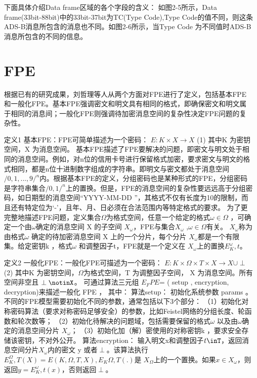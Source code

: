 下面具体介绍Data frame区域的各个字段的含义：
如图2-5所示，Data frame(33bit-88bit)中的33bit-37bit为TC(Type Code),Type Code的值不同，则这条ADS-B消息所包含的消息也不同。如图2-6所示，当Type Code 为不同值时ADS-B消息所包含的不同的信息。


\section{FPE}
根据已有的研究成果，刘哲理等人\cite{liu2012ge}从两个方面对FPE进行了定义，包括基本FPE和一般化FPE。基本FPE强调密文和明文具有相同的格式，即确保密文和明文属于相同的消息间；一般化FPE则强调待加密消息空间的复杂性决定FPE问题的复杂性。

定义1 基本FPE：FPE可简单描述为一个密码： 
$E \colon K \times X \to X$                   (1)
其中K 为密钥空间，X 为消息空间\cite{bellare2010ffx}。 
基本FPE描述了FPE要解决的问题，即密文与明文处于相同的消息空间。例如，对n位的信用卡号进行保留格式加密，要求密文与明文的格式相同，都是n位十进制数字组成的字符串。即明文与密文都处于消息空间$/{0,1,...,9/}^n$内。根据基本FPE的定义，分组密码也是某种形式的FPE，分组密码是字符串集合$/{0,1/}^n$上的置换。但是，FPE的消息空间的复杂性要远远高于分组密码，如日期型的消息空间“YYYY-MM-DD ”，其格式不仅有长度为10的限制，而且还有特定位为‘-’，且年、月、日必须在合法范围内等特定格式的要求。 
为了更完整地描述FPE问题，定义集合$\Omega$为格式空间，任意一个给定的格式$\omega \in \Omega$ ，可确定一个由$\omega$确定的消息空间 X 的子空间 $X_\omega$，FPE与集合{$X_\omega$} ,$\omega \in \Omega$有关。 $X_\omega$称为由格式$\omega$ 确定的待加密消息空间 X 上的一个分片，每个分片 $X_\omega$都是一个有限集。给定密钥k ，格式$\omega$ 和调整因子t，FPE就是一个定义在 $X_\omega$上的置换$E_K ^\omega,t$。 

定义2 一般化FPE：一般化FPE可描述为一个密码： 
$E \colon K \times \Omega \times T \times X \to X \cup {\perp}$                   (2) 
其中K 为密钥空间，$\Omega$为格式空间，T 为调整因子空间， X 为消息空间。所有空间非空且 $\perp\notinX$\cite{bellare2009format}。 
可通过算法三元组
$E_FPE$= ( setup , encryption, decryption)来描述一般化 FPE ，
其中： 
算法setup： 
初始化系统参数 params 。不同的FPE模型需要初始化不同的参数，通常包括以下3个部分： 
（1）初始化对称密码算法（要求对称密码足够安全）的参数，比如Feistel网络的分组长度、轮函数和轮次数等； 
（2）初始化待解决的问题域，包括需要保留的格式$\omega$ 以及由$\omega$确定的消息空间分片 $X_\omega$； 
（3）初始化加（解）密使用的对称密钥k ，要求安全存储该密钥，不对外公开。 
算法encryption： 
输入明文x和调整因子$t\inT$，返回消息空间分片$ X_\omega$内的密文 y 或者$\perp$。该算法执行$E_K^\Omega,T(X)=E(K,\Omega,T,X),E_K \Omega,T(.)$是 $X_\Omega$上的一个置换。如果$x\in X_\omega$，则返回$y=E_K ^\omega,t(x)$，否则返回$\perp$。 


